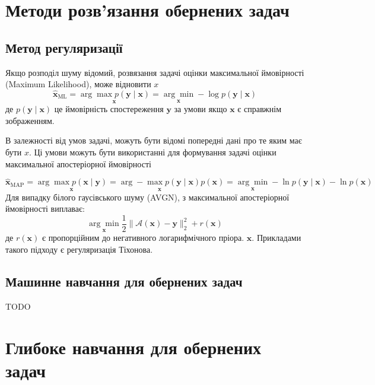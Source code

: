 \documentclass[14pt,a4paper]{extarticle}
\newcounter{e}
\numberwithin{equation}{section}
\numberwithin{figure}{section}
\begin{document}
	\newpage
	\thispagestyle{empty}
	\section{Методи розв'язання обернених задач}

	\subsection{Метод регуляризації}
	
	Якщо розподіл шуму відомий, розвязання задачі оцінки максимальної ймовірності (Maximum Likelihood), може відновити $x$
	$$
	\hat{\boldsymbol{x}}_{\mathrm{ML}}
	=\underset{\boldsymbol{x}}{\arg \max{ p (\boldsymbol{y} \mid \boldsymbol{x}) }}
	=\underset{\boldsymbol{x}}{\arg \min }-\log p(\boldsymbol{y} \mid \boldsymbol{x})
	$$
	де $p(\boldsymbol{y} \mid \boldsymbol{x})$ це ймовірність спостереження $\boldsymbol{y}$ за умови якщо $\boldsymbol{x}$ є справжнім зображенням.
	
	В залежності від умов задачі, можуть бути відомі попередні дані про те яким має бути $x$. Ці умови можуть бути використанні для формування  задачі оцінки максимальної апостеріорної ймовірності

	$$
	\hat{\boldsymbol{x}}_{\mathrm{MAP}}
	=\underset{\boldsymbol{x}}{\arg \max{ p(\boldsymbol{x} \mid \boldsymbol{y}) }}
	=\underset{\boldsymbol{x}}{\arg -\max{ p(\boldsymbol{y} \mid \boldsymbol{x})} } p(\boldsymbol{x})
	=\underset{\boldsymbol{x}}{\arg \min }-\ln p(\boldsymbol{y} \mid \boldsymbol{x})-\ln p(\boldsymbol{x})
	$$
	Для випадку білого гаусівського шуму (AVGN), з максимальної апостеріорної ймовірності виплаває:
	$$
	\underset{\boldsymbol{x}}{\arg \min } \frac{1}{2}\|\mathcal{A}(\boldsymbol{x})-\boldsymbol{y}\|_{2}^{2}+r(\boldsymbol{x})
	$$
	де  $r(\boldsymbol{x})$ є пропорційним до негативного логарифмічного пріора. $\boldsymbol{x} .$ 	Прикладами такого підходу є регуляризація Тіхонова.
	

	\subsection{Машинне навчання для обернених задач}
	TODO
	
	\newpage
	\thispagestyle{empty}
	\section{Глибоке навчання для обернених задач}
	
\end{document}
